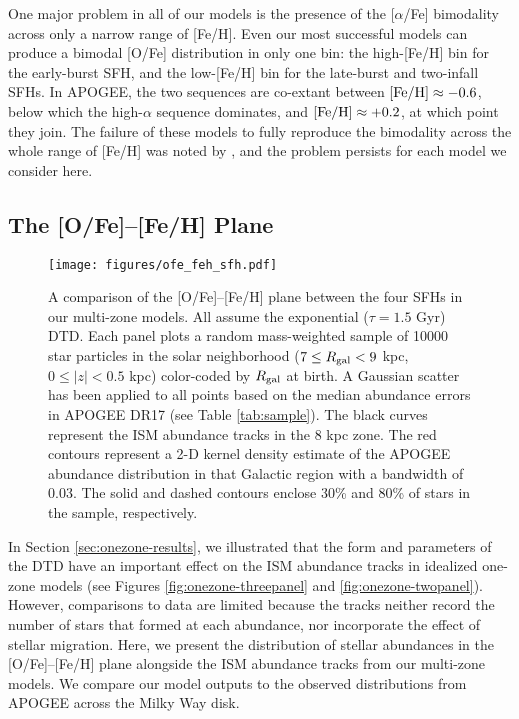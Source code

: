 \documentclass[twocolumn,twocolappendix,linenumbers]{aastex631}
\newcommand{\aFe}{[$\alpha$/Fe]\xspace}
\begin{document}
One major problem in all of our models is the presence of the \aFe bimodality across only a narrow range of [Fe/H]. Even our most successful models can produce a bimodal [O/Fe] distribution in only one bin: the high-[Fe/H] bin for the early-burst SFH, and the low-[Fe/H] bin for the late-burst and two-infall SFHs. In APOGEE, the two sequences are co-extant between ${\rm [Fe/H]}\approx-0.6$, below which the high-$\alpha$ sequence dominates, and ${\rm [Fe/H]}\approx+0.2$, at which point they join. The failure of these models to fully reproduce the bimodality across the whole range of [Fe/H] was noted by , and the problem persists for each model we consider here.

\subsection{The [O/Fe]--[Fe/H] Plane}
\label{sec:ofe-feh}

\begin{figure}
    \centering
    \texttt{[image: figures/ofe\_feh\_sfh.pdf]}
    \caption{A comparison of the [O/Fe]--[Fe/H] plane between the four SFHs in our multi-zone models. All assume the exponential ($\tau=1.5$ Gyr) DTD. Each panel plots a random mass-weighted sample of \num{10000} star particles in the solar neighborhood ($7\leq R_{\rm gal}<9$ kpc, $0\leq|z|<0.5$ kpc) color-coded by $R_{\rm gal}$ at birth. A Gaussian scatter has been applied to all points based on the median abundance errors in APOGEE DR17 (see Table \ref{tab:sample}). The black curves represent the ISM abundance tracks in the 8 kpc zone. The red contours represent a 2-D kernel density estimate of the APOGEE abundance distribution in that Galactic region with a bandwidth of 0.03. The solid and dashed contours enclose 30\% and 80\% of stars in the sample, respectively.}
    \label{fig:ofe-feh-sfh}
\end{figure}

In Section \ref{sec:onezone-results}, we illustrated that the form and parameters of the DTD have an important effect on the ISM abundance tracks in idealized one-zone models (see Figures \ref{fig:onezone-threepanel} and \ref{fig:onezone-twopanel}). However, comparisons to data are limited because the tracks neither record the number of stars that formed at each abundance, nor incorporate the effect of stellar migration. Here, we present the distribution of stellar abundances in the [O/Fe]--[Fe/H] plane alongside the ISM abundance tracks from our multi-zone models. We compare our model outputs to the observed distributions from APOGEE across the Milky Way disk.
\end{document}
